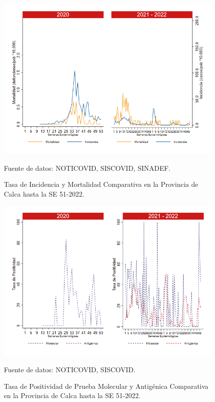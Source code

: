 \documentclass[12pt,a4paper,openany]{book}
\begin{document}
	\begin{figure}[h]
		\caption{Tasa de Incidencia y Mortalidad Comparativa en la Provincia de Calca hasta la SE 51-2022.}\label{fig:inc_mort_calca}
		\begin{center}
			\includegraphics[width=0.85\linewidth]{../figuras/incidencia_mortalidad_20_21_3.png}
		\end{center}
		{\footnotesize {Fuente de datos: NOTICOVID, SISCOVID, SINADEF.}}
	\end{figure}
	
	\begin{figure}[h]
		\caption{Tasa de Positividad de Prueba Molecular y Antigénica Comparativa en la Provincia de Calca hasta la SE 51-2022.}\label{fig:positividad_calca}
		\begin{center}
			\includegraphics[width=0.7\linewidth]{../figuras/positividad_20_21_3.png}
		\end{center}
		{\footnotesize {Fuente de datos: NOTICOVID, SISCOVID.}}
	\end{figure}
	
\end{document}
